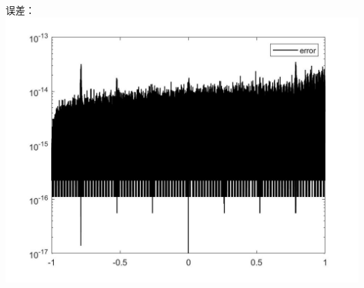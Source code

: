 \documentclass[12pt,a4paper,utf8]{ctexart}
\begin{document}
\begin{enumerate}
误差：\\
\includegraphics[width = .8\textwidth]{1.d.error.jpg}


\end{enumerate}
\end{document}
